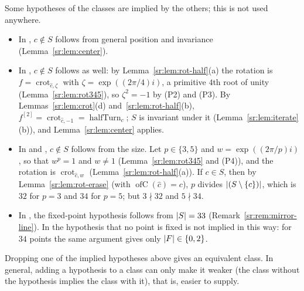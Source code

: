 \begin{remark}\label{sr:rem:redundant}
Some hypotheses of the classes are implied by the others; this is not used anywhere.
\begin{itemize}
\item In , $c\notin S$ follows from general position and invariance (Lemma~\ref{sr:lem:center}).
\item In , $c\notin S$ follows as well: by Lemma~\ref{sr:lem:rot-half}(a) the rotation is
  $f=\operatorname{crot}_{\hat c,\zeta}$ with $\zeta=\exp((2\pi/4)i)$, a primitive $4$th root of unity
  (Lemma~\ref{sr:lem:rot345}), so $\zeta^2=-1$ by (P2) and (P3). By Lemmas~\ref{sr:lem:crot}(d)
  and~\ref{sr:lem:rot-half}(b), $f^{[2]}=\operatorname{crot}_{\hat c,-1}=\operatorname{halfTurn}_c$; $S$ is invariant under
  it (Lemma~\ref{sr:lem:iterate}(b)), and Lemma~\ref{sr:lem:center} applies.
\item In  and , $c\notin S$ follows from the size. Let $p\in\{3,5\}$ and
  $w=\exp((2\pi/p)i)$, so that $w^p=1$ and $w\ne1$ (Lemma~\ref{sr:lem:rot345} and (P4)), and the rotation is
  $\operatorname{crot}_{\hat c,w}$ (Lemma~\ref{sr:lem:rot-half}(a)). If $c\in S$, then by Lemma~\ref{sr:lem:rot-erase}
  (with $\operatorname{ofC}(\hat c)=c$), $p$ divides $\lvert(S\setminus\{c\})\rvert$, which is $32$ for $p=3$ and $34$ for
  $p=5$; but $3\nmid32$ and $5\nmid34$.
\item In , the fixed-point hypothesis follows from $\lvert S\rvert=33$ (Remark~\ref{sr:rem:mirror-line}).
  In  the hypothesis that no point is fixed is not implied in this way: for $34$ points the same
  argument gives only $\lvert F\rvert\in\{0,2\}$.
\end{itemize}
Dropping one of the implied hypotheses above gives an equivalent class. In general, adding a hypothesis to a class can
only make it weaker (the class without the hypothesis implies the class with it), that is, easier to supply.
\end{remark}

